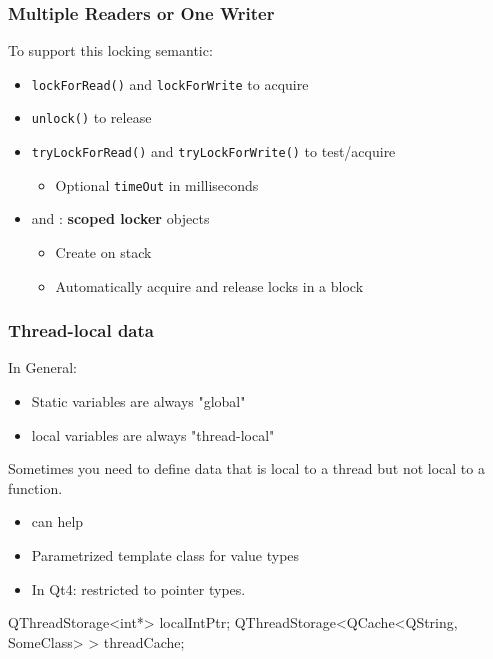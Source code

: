 \begin{slide}
\frametitle{Multiple Readers or One Writer}

To support this locking semantic: 
\begin{itemize}
\item \texttt{lockForRead()} and \texttt{lockForWrite} to acquire
\item \texttt{unlock()} to release
\item \texttt{tryLockForRead()} and \texttt{tryLockForWrite()} to test/acquire
    \begin{itemize}
    \item Optional \texttt{timeOut} in milliseconds
    \end{itemize}
\item {} and : \textbf{scoped locker} objects
    \begin{itemize}
    \item Create on stack
    \item Automatically acquire and release locks in a block
    \end{itemize}
\end{itemize}

\end{slide}
\begin{slide}[fragile]
\frametitle{Thread-local data}
In General:
\begin{itemize}
\item Static variables are always "global"
\item local variables are always "thread-local"
\end{itemize}
Sometimes you need to define data that is local to a thread but not local
to a function.
\begin{itemize}
\item {} can help
\item Parametrized template class for value types
\item In Qt4: restricted to pointer types.
\end{itemize}
\begin{cpp}
QThreadStorage<int*> localIntPtr;
QThreadStorage<QCache<QString, SomeClass> > threadCache;
\end{cpp}

\end{slide}

